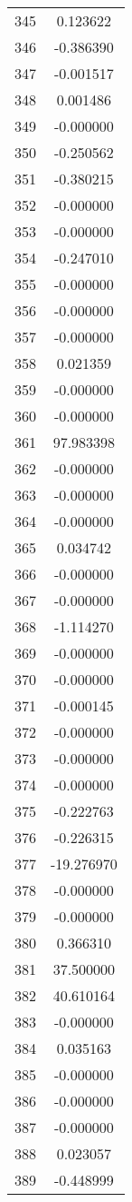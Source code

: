 \documentclass[12pt]{article}
\begin{document}
\begin{longtable}{@{}cc@{}}
345 & 0.123622 \\
346 & -0.386390 \\
347 & -0.001517 \\
348 & 0.001486 \\
349 & -0.000000 \\
350 & -0.250562 \\
351 & -0.380215 \\
352 & -0.000000 \\
353 & -0.000000 \\
354 & -0.247010 \\
355 & -0.000000 \\
356 & -0.000000 \\
357 & -0.000000 \\
358 & 0.021359 \\
359 & -0.000000 \\
360 & -0.000000 \\
361 & 97.983398 \\
362 & -0.000000 \\
363 & -0.000000 \\
364 & -0.000000 \\
365 & 0.034742 \\
366 & -0.000000 \\
367 & -0.000000 \\
368 & -1.114270 \\
369 & -0.000000 \\
370 & -0.000000 \\
371 & -0.000145 \\
372 & -0.000000 \\
373 & -0.000000 \\
374 & -0.000000 \\
375 & -0.222763 \\
376 & -0.226315 \\
377 & -19.276970 \\
378 & -0.000000 \\
379 & -0.000000 \\
380 & 0.366310 \\
381 & 37.500000 \\
382 & 40.610164 \\
383 & -0.000000 \\
384 & 0.035163 \\
385 & -0.000000 \\
386 & -0.000000 \\
387 & -0.000000 \\
388 & 0.023057 \\
389 & -0.448999 \\

\end{longtable}
\end{document}
